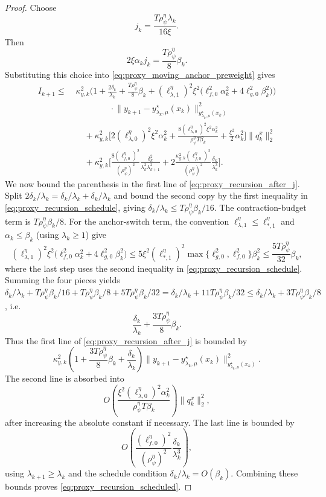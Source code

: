\documentclass{article}
\begin{document}
\begin{proof}
Choose
\[
j_k=\frac{T\rho_\psi^\eta\lambda_k}{16\xi}.
\]
Then
\[
2\xi\alpha_k j_k
=
\frac{T\rho_\psi^\eta}{8}\beta_k .
\]
Substituting this choice into \eqref{eq:proxy_moving_anchor_preweight} gives
\begin{align}
I_{k+1}
\le\;&
\kappa_{y,k}^2
\Bigg(
1+\frac{2\delta_k}{\lambda_k}
+\frac{T\rho_\psi^\eta}{8}\beta_k
+(\ell_{\lambda,1}^\eta)^2\xi^2
\bigl(\ell_{f,0}^2\alpha_k^2+4\ell_{g,0}^2\beta_k^2\bigr)
\Bigg)
\nonumber\\
&\qquad\qquad\cdot
\big\|y_{k+1}-y_{\lambda_k,\mu}^\star(x_k)
\big\|_{y_{\lambda_k,\mu}^\star(x_k)}^2
\nonumber\\
&\quad
+\kappa_{y,k}^2
\Bigg[
2(\ell_{\lambda,0}^\eta)^2\xi^2\alpha_k^2
+
\frac{8(\ell_{\lambda,0}^\eta)^2\xi^2\alpha_k^2}{\rho_\psi^\eta T\beta_k}
+
\frac{\xi^2}{2}\alpha_k^2
\Bigg]\|q_k^x\|_2^2
\nonumber\\
&\quad
+\kappa_{y,k}^2
\Bigg[
\frac{8(\ell_{f,0}^\eta)^2}{(\rho_\psi^\eta)^2}
\frac{\delta_k^2}{\lambda_k^2\lambda_{k+1}^2}
+
2\frac{\kappa_{y,k}^2(\ell_{f,0}^\eta)^2}{(\rho_\psi^\eta)^2}
\frac{\delta_k}{\lambda_k^3}
\Bigg].
\label{eq:proxy_recursion_after_j}
\end{align}
We now bound the parenthesis in the first line of \eqref{eq:proxy_recursion_after_j}.
Split \(2\delta_k/\lambda_k=\delta_k/\lambda_k+\delta_k/\lambda_k\) and bound the second
copy by the first inequality in \eqref{eq:proxy_recursion_schedule}, giving
\(\delta_k/\lambda_k\le T\rho_\psi^\eta\beta_k/16\). The contraction-budget term is
\(T\rho_\psi^\eta\beta_k/8\). For the anchor-switch term, the convention
\(\ell_{\lambda,1}^\eta\le\ell_{*,1}^\eta\) and \(\alpha_k\le\beta_k\) (using
\(\lambda_k\ge 1\)) give
\[
(\ell_{\lambda,1}^\eta)^2\xi^2\bigl(\ell_{f,0}^2\alpha_k^2+4\ell_{g,0}^2\beta_k^2\bigr)
\le
5\xi^2(\ell_{*,1}^\eta)^2\max\{\ell_{g,0}^2,\ell_{f,0}^2\}\beta_k^2
\le
\frac{5T\rho_\psi^\eta}{32}\beta_k,
\]
where the last step uses the second inequality in \eqref{eq:proxy_recursion_schedule}.
Summing the four pieces yields
\(\delta_k/\lambda_k + T\rho_\psi^\eta\beta_k/16 + T\rho_\psi^\eta\beta_k/8 +
5T\rho_\psi^\eta\beta_k/32 = \delta_k/\lambda_k + 11T\rho_\psi^\eta\beta_k/32
\le \delta_k/\lambda_k + 3T\rho_\psi^\eta\beta_k/8\), i.e.
\[
\frac{\delta_k}{\lambda_k}+\frac{3T\rho_\psi^\eta}{8}\beta_k .
\]
Thus the first line of \eqref{eq:proxy_recursion_after_j} is bounded by
\[
\kappa_{y,k}^2
\left(1+\frac{3T\rho_\psi^\eta}{8}\beta_k+\frac{\delta_k}{\lambda_k}\right)
\big\|y_{k+1}-y_{\lambda_k,\mu}^\star(x_k)
\big\|_{y_{\lambda_k,\mu}^\star(x_k)}^2 .
\]
The second line is absorbed into
\[
O\!\left(
\frac{\xi^2(\ell_{\lambda,0}^{\eta})^2\alpha_k^2}{\rho_\psi^\eta T\beta_k}
\right)\|q_k^x\|_2^2,
\]
after increasing the absolute constant if necessary. The last line is bounded by
\[
O\!\left(
\frac{(\ell_{f,0}^{\eta})^2}{(\rho_\psi^\eta)^2}
\frac{\delta_k}{\lambda_k^3}
\right),
\]
using \(\lambda_{k+1}\ge \lambda_k\) and the schedule condition
\(\delta_k/\lambda_k=O(\beta_k)\). Combining these bounds proves
\eqref{eq:proxy_recursion_scheduled}.
\end{proof}
\end{document}
